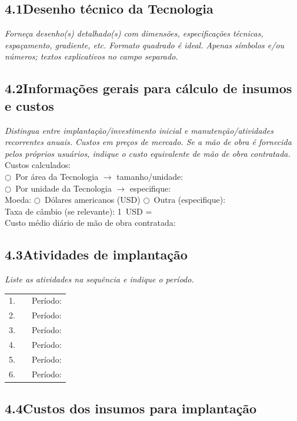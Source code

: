 \subsection{4.1\quad Desenho técnico da Tecnologia}
\textit{Forneça desenho(s) detalhado(s) com dimensões, especificações técnicas, espaçamento, gradiente, etc. Formato quadrado é ideal. Apenas símbolos e/ou números; textos explicativos no campo separado.}

\subsection{4.2\quad Informações gerais para cálculo de insumos e custos}
\textit{Distingua entre implantação/investimento inicial e manutenção/atividades recorrentes anuais. Custos em preços de mercado. Se a mão de obra é fornecida pelos próprios usuários, indique o custo equivalente de mão de obra contratada.}\\[4pt]
Custos calculados:\\
$\bigcirc$~Por área da Tecnologia $\rightarrow$ tamanho/unidade: \dotfill\\
$\bigcirc$~Por unidade da Tecnologia $\rightarrow$ especifique: \dotfill\\
Moeda: $\bigcirc$~Dólares americanos (USD) \quad $\bigcirc$~Outra (especifique): \dotfill\\
Taxa de câmbio (se relevante): 1~USD = \dotfill\\
Custo médio diário de mão de obra contratada: \dotfill

\subsection{4.3\quad Atividades de implantação}
\textit{Liste as atividades na sequência e indique o período.}\\[4pt]
\begin{tabular}{clp{4cm}}
1. & \dotfill & Período: \dotfill \\
2. & \dotfill & Período: \dotfill \\
3. & \dotfill & Período: \dotfill \\
4. & \dotfill & Período: \dotfill \\
5. & \dotfill & Período: \dotfill \\
6. & \dotfill & Período: \dotfill \\
\end{tabular}

\subsection{4.4\quad Custos dos insumos para implantação}

